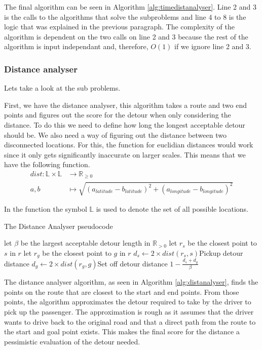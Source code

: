 The final algorithm can be seen in Algorithm \ref{alg:timedistanalyser}.
Line 2 and 3 is the calls to the algorithms that solve the subproblems and line 4 to 8 is the logic that was explained in the previous paragraph.
The complexity of the algorithm is dependent on the two calls on line 2 and 3 because the rest of the algorithm is input independant and, therefore, $O(1)$ if we ignore line 2 and 3.

\subsubsection{Distance analyser}

Lets take a look at the sub problems.

First, we have the distance analyser, this algorithm takes a route and two end points and figures out the score for the detour when only considering the distance.
To do this we need to define how long the longest acceptable detour should be.
We also need a way of figuring out the distance between two disconnected locations. 
For this, the function for euclidian distances would work since it only gets significantly inaccurate on larger scales.
This means that we have the following function.
\begin{align*}
	dist : \mathbb{L}\times\mathbb{L} &\rightarrow \mathbb{R}_{\geq 0}\\
	a, b &\mapsto \sqrt{(a_{latitude} - b_{latitude})^2 + (a_{longitude} - b_{longitude})^2}
\end{align*}

In the function the symbol $\mathbb{L}$ is used to denote the set of all possible locations.


\begin{algorithm}
	\caption{The Distance Analyser pseudocode}
	\label{alg:distanalyser}
	\begin{algorithmic}[1]
		\Require 
		\Statex let $\beta$ be the largest acceptable detour length in $\mathbb{R}_{>0}$ 
		\Statex 
			\State let $r_s$ be the closest point to $s$ in $r$
			\State let $r_g$ be the closest point to $g$ in $r$
			\State $d_s\gets 2\times dist(r_s, s)$\Comment Pickup detour distance
			\State $d_g\gets 2\times dist(r_g, g)$\Comment Set off detour distance
			\State\Return $1-\frac{d_s + d_g}{\beta}$
		\EndFunction
	\end{algorithmic}
\end{algorithm}

The distance analyser algorithm, as seen in Algorithm \ref{alg:distanalyser}, finds the points on the route that are closest to the start and end points.
From those points, the algorithm approximates the detour required to take by the driver to pick up the passenger.
The approximation is rough as it assumes that the driver wants to drive back to the original road and that a direct path from the route to the start and goal point exists.
This makes the final score for the distance a pessimistic evaluation  of the detour needed.

